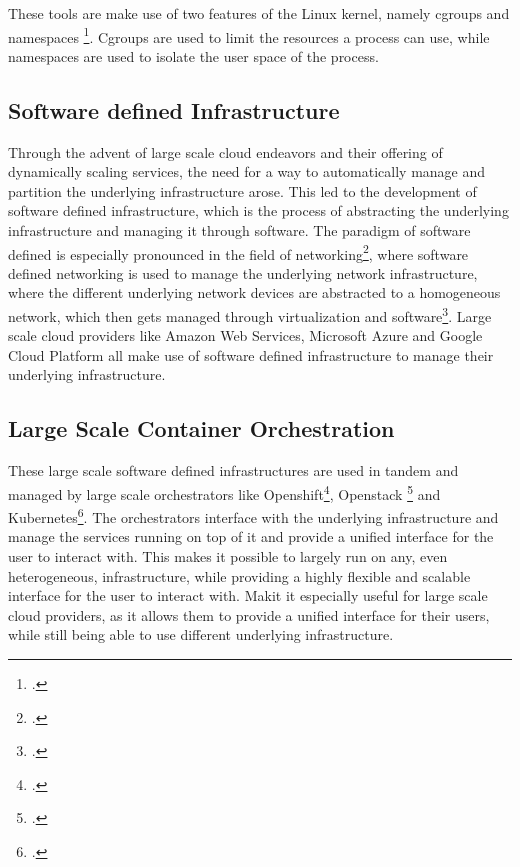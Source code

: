 These tools are make use of two features of the Linux kernel, namely cgroups and namespaces \footcite{WhatContainerDocker}.
Cgroups are used to limit the resources a process can use, while namespaces are used to isolate the user space of the process.

\subsection*{Software defined Infrastructure}

Through the advent of large scale cloud endeavors and their offering of dynamically scaling services, the need for a way to automatically manage and partition the underlying infrastructure arose.
This led to the development of software defined infrastructure, which is the process of abstracting the underlying infrastructure and managing it through software.
The paradigm of software defined is especially pronounced in the field of networking\footcite{xiaSurveySoftwareDefinedNetworking2015}, where software defined networking is used to manage the underlying network infrastructure,
where the different underlying network devices are abstracted to a homogeneous network, which then gets managed through virtualization and software\footcite{baurCloudOrchestrationFeatures2015}.
Large scale cloud providers like Amazon Web Services, Microsoft Azure and Google Cloud Platform all make use of software defined infrastructure to manage their underlying infrastructure.

\subsection*{Large Scale Container Orchestration}

These large scale software defined infrastructures are used in tandem and managed by large scale orchestrators like Openshift\footcite{RedHatOpenShift}, Openstack \footcite{OpenSourceCloud} and Kubernetes\footcite{ProductionGradeContainerOrchestration}. 
The orchestrators interface with the underlying infrastructure and manage the services running on top of it and provide a unified interface for the user to interact with.
This makes it possible to largely run on any, even heterogeneous, infrastructure, while providing a highly flexible and scalable interface for the user to interact with.
Makit it especially useful for large scale cloud providers, as it allows them to provide a unified interface for their users, while still being able to use different underlying infrastructure.

